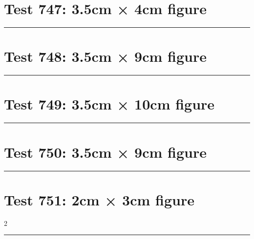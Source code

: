 \documentclass[a4paper,11pt]{article}
\begin{document}
\section*{Test 747: 3.5cm × 4cm figure}
\begin{swarmwrap}%
  \begin{minipage}[t]{3cm}
    \centering
    \rule{\linewidth}{4cm}
  \end{minipage}%
\end{swarmwrap}%
\swarmwrapnext
\lipsum[108]
\lipsum[109]
\lipsum[110]
\lipsum[111]
\lipsum[112]
\section*{Test 748: 3.5cm × 9cm figure}
\begin{swarmwrap}%
  \begin{minipage}[t]{3cm}
    \centering
    \rule{\linewidth}{9cm}
  \end{minipage}%
\end{swarmwrap}%
\swarmwrapnext
\lipsum[25]
\lipsum[26]
\lipsum[27]
\section*{Test 749: 3.5cm × 10cm figure}
\begin{swarmwrap}%
  \begin{minipage}[t]{3cm}
    \centering
    \rule{\linewidth}{10cm}
  \end{minipage}%
\end{swarmwrap}%
\swarmwrapnext
\lipsum[96]
\lipsum[97]
\lipsum[98]
\lipsum[99]
\lipsum[100]
\section*{Test 750: 3.5cm × 9cm figure}
\begin{swarmwrap}%
  \begin{minipage}[t]{3cm}
    \centering
    \rule{\linewidth}{9cm}
  \end{minipage}%
\end{swarmwrap}%
\swarmwrapnext
\lipsum[150]
\lipsum[1]
\lipsum[2]
\lipsum[3]
\lipsum[4]
\section*{Test 751: 2cm × 3cm figure}
\begin{multicols}{2}
  \begin{swarmwrap}%
    \begin{minipage}[t]{2cm}
      \centering
      \rule{\linewidth}{3cm}
    \end{minipage}%
  \end{swarmwrap}%
  \swarmwrapnext
  \lipsum[93]
  \lipsum[94]
  \lipsum[95]
  \lipsum[96]
  \lipsum[97]
  \lipsum[98]
\end{multicols}
\end{document}
